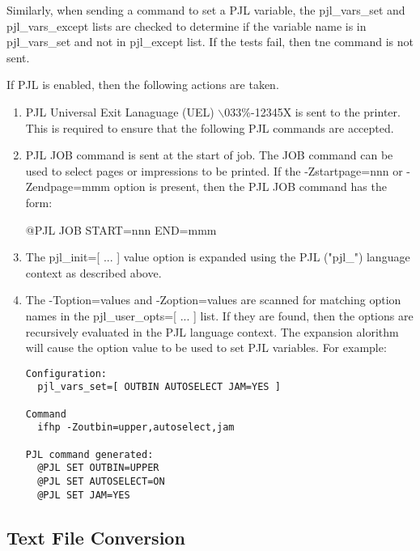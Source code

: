 \documentclass[a4paper]{article}
\begin{document}
Similarly,
when sending a command to set a PJL variable,
the
{\ttfamily pjl\_vars\_set}
and
{\ttfamily pjl\_vars\_except}
lists are checked to determine if the variable name is in
{\ttfamily pjl\_vars\_set}
and not in
{\ttfamily pjl\_except}
list.
If the tests fail, then tne command is not sent.

If PJL is enabled,
then the following actions are taken.
\begin{enumerate}
\item  PJL Universal Exit Lanaguage (UEL) {\ttfamily $\backslash$033\%-12345X} is sent to the printer.
This is required to ensure that the following PJL commands are
accepted.

\item  PJL JOB command is sent at the start of job.
The JOB command can be used to select pages or impressions to be printed.
If the
{\ttfamily -Zstartpage=nnn}
or
{\ttfamily -Zendpage=mmm}
option is present, then the PJL JOB command has the form:
\begin{tscreen}
@PJL JOB START=nnn END=mmm
\end{tscreen}
\item  The
{\ttfamily pjl\_init=[ ... ]}
value option is expanded using the PJL
({\ttfamily "pjl\_"}) language context as described above.
\item  The
{\ttfamily -Toption=value}s
and
{\ttfamily -Zoption=value}s
are scanned for matching option names in the 
{\ttfamily pjl\_user\_opts=[ ... ]} 
list.
If they are found,
then the options are recursively evaluated in the PJL language context.
The expansion alorithm will cause the option value to be used to set PJL
variables.
For example:
\begin{tscreen}
\begin{verbatim}
Configuration:
  pjl_vars_set=[ OUTBIN AUTOSELECT JAM=YES ]

Command
  ifhp -Zoutbin=upper,autoselect,jam

PJL command generated:
  @PJL SET OUTBIN=UPPER
  @PJL SET AUTOSELECT=ON
  @PJL SET JAM=YES
\end{verbatim}
\end{tscreen}
\end{enumerate}



\subsection{Text File Conversion
\label{textfile}
\label{default_language}
\label{file_util_path}
\label{text_converter}
\label{text_converter_output}
\label{text_tempfile}
\label{language}}
\end{document}
